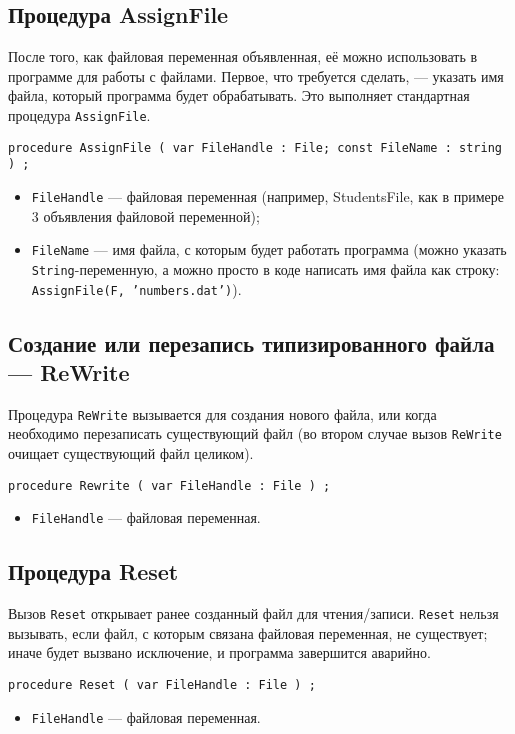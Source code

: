 \documentclass[10pt,a4paper]{report}
\begin{document}
\subsection*{Процедура AssignFile}
После того, как файловая переменная объявленная, её можно использовать в программе для работы с файлами. Первое, что требуется сделать, --- указать имя файла, который программа будет обрабатывать. Это выполняет стандартная процедура \texttt{AssignFile}.
\begin{verbatim}
procedure AssignFile ( var FileHandle : File; const FileName : string ) ;
\end{verbatim}

\begin{itemize}
\item \texttt{FileHandle} --- файловая переменная (например, StudentsFile, как в примере 3 объявления файловой переменной);
\item \texttt{FileName} --- имя файла, с которым будет работать программа (можно указать \texttt{String}-переменную, а можно просто в коде написать имя файла как строку: \texttt{AssignFile(F, 'numbers.dat')}).
\end{itemize}

\subsection*{Создание или перезапись типизированного файла --- ReWrite}
Процедура \texttt{ReWrite} вызывается для создания нового файла, или когда необходимо перезаписать существующий файл (во втором случае вызов \texttt{ReWrite} очищает существующий файл целиком).
\begin{verbatim}
procedure Rewrite ( var FileHandle : File ) ;
\end{verbatim}
\begin{itemize}
\item \texttt{FileHandle} --- файловая переменная.
\end{itemize}


\subsection*{Процедура Reset}
Вызов \texttt{Reset} открывает ранее созданный файл для чтения/записи. \texttt{Reset} нельзя вызывать, если файл, с которым связана файловая переменная, не существует; иначе будет вызвано исключение, и программа завершится аварийно.
\begin{verbatim}
procedure Reset ( var FileHandle : File ) ;
\end{verbatim}
\begin{itemize}
\item \texttt{FileHandle} --- файловая переменная.
\end{itemize}
\end{document}
